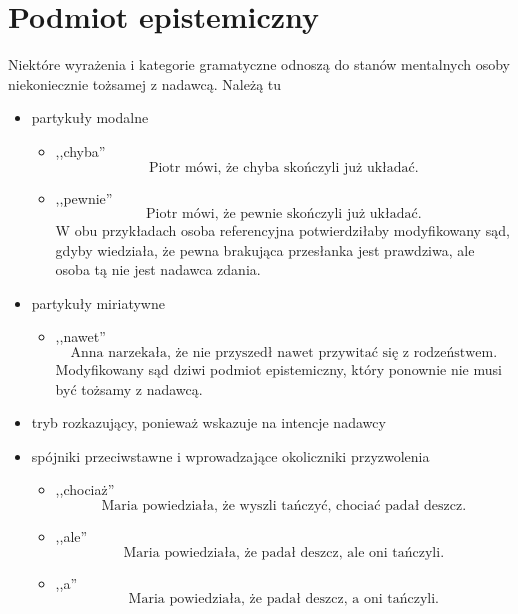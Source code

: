 \documentclass[a4paper, 12pt]{article}
\theoremstyle{remark}
\begin{document}
\section{Podmiot epistemiczny}
Niektóre wyrażenia i kategorie gramatyczne odnoszą do stanów mentalnych osoby niekoniecznie tożsamej z nadawcą. Należą tu
\begin{itemize}

\item partykuły modalne

	\begin{itemize}
	\item ,,chyba''
	\begin{equation}
		\text{Piotr mówi, że chyba skończyli już układać.}
	\end{equation}
	\item ,,pewnie''
	\begin{equation}
		\text{Piotr mówi, że pewnie skończyli już układać.}
	\end{equation}
	W obu przykładach osoba referencyjna potwierdziłaby modyfikowany sąd, gdyby wiedziała, że pewna brakująca przesłanka jest prawdziwa, ale osoba tą nie jest nadawca zdania.
	\end{itemize}

\item partykuły miriatywne

	\begin{itemize}
	\item ,,nawet''
	\begin{equation}
		\text{Anna narzekała, że nie przyszedł nawet przywitać się z rodzeństwem.}
	\end{equation}
	Modyfikowany sąd dziwi podmiot epistemiczny, który ponownie nie musi być tożsamy z nadawcą.
	\end{itemize}

\item tryb rozkazujący, ponieważ wskazuje na intencje nadawcy
\item spójniki przeciwstawne i wprowadzające okoliczniki przyzwolenia
	\begin{itemize}
		\item ,,chociaż''
		\begin{equation}
			\text{Maria powiedziała, że wyszli tańczyć, chociać padał deszcz.}
		\end{equation}
		\item ,,ale''
		\begin{equation}
			\text{Maria powiedziała, że padał deszcz, ale oni tańczyli.}
		\end{equation}
		\item ,,a''
		\begin{equation}
			\text{Maria powiedziała, że padał deszcz, a oni tańczyli.}
		\end{equation}
	\end{itemize}

\end{itemize}
\end{document}
